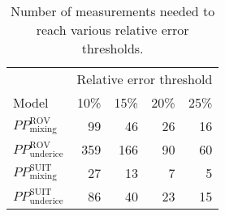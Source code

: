 \begin{table}[ht]
\centering
\begin{tabular}{lrrrr}
  \toprule
  & \multicolumn{4}{c}{Relative error threshold} \\
 Model & 10\% & 15\% & 20\% & 25\% \\
 \midrule
$PP^{\mathrm{ROV}}_{\mathrm{mixing}}$ & 99 & 46 & 26 & 16 \\ 
  $PP^{\mathrm{ROV}}_{\mathrm{underice}}$ & 359 & 166 & 90 & 60 \\ 
  $PP^{\mathrm{SUIT}}_{\mathrm{mixing}}$ & 27 & 13 & 7 & 5 \\ 
  $PP^{\mathrm{SUIT}}_{\mathrm{underice}}$ & 86 & 40 & 23 & 15 \\ 
   \bottomrule
\end{tabular}
\caption{Number of measurements needed to reach various relative error thresholds.} 
\end{table}
